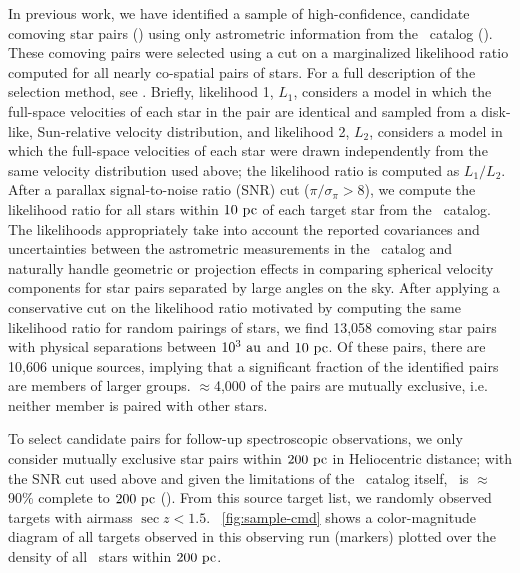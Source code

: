 \documentclass[modern, letterpaper]{aastex61}
\newcommand{\tgas}{\acronym{TGAS}}
\begin{document}
In previous work, we have identified a sample of high-confidence, candidate
comoving star pairs (\citealt{Oh:2017}) using only astrometric information from
the \tgas\ catalog (\citealt{tgas}).
These comoving pairs were selected using a cut on a marginalized likelihood
ratio computed for all nearly co-spatial pairs of stars.
For a full description of the selection method, see \citealt{Oh:2017}.
Briefly, likelihood 1, $L_1$, considers a model in which the full-space
velocities of each star in the pair are identical and sampled from a disk-like,
Sun-relative velocity distribution, and likelihood 2, $L_2$, considers a model
in which the full-space velocities of each star were drawn independently from
the same velocity distribution used above; the likelihood ratio is computed as
$L_1/L_2$.
After a parallax signal-to-noise ratio (SNR) cut ($\pi/\sigma_\pi > 8$), we
compute the likelihood ratio for all stars within $10~\mathrm{pc}$ of each target star
from the \tgas\ catalog.
The likelihoods appropriately take into account the reported covariances and
uncertainties between the astrometric measurements in the \tgas\ catalog and
naturally handle geometric or projection effects in comparing spherical
velocity components for star pairs separated by large angles on the sky.
After applying a conservative cut on the likelihood ratio motivated by
computing the same likelihood ratio for random pairings of stars, we find
13,058 comoving star pairs with physical separations between $10^3~\mathrm{au}$ and
$10~\mathrm{pc}$.
Of these pairs, there are 10,606 unique sources, implying that a significant
fraction of the identified pairs are members of larger groups.
$\approx$4,000 of the pairs are mutually exclusive, i.e. neither member is
paired with other stars.

To select candidate pairs for follow-up spectroscopic observations, we only
consider mutually exclusive star pairs within $200~\mathrm{pc}$ in Heliocentric
distance; with the SNR cut used above and given the limitations of the \tgas\
catalog itself, \tgas\ is $\approx$90\% complete to $200~\mathrm{pc}$
(\citealt{Bovy:2017}).
From this source target list, we randomly observed targets with airmass $\sec z
< 1.5$.
\figurename~\ref{fig:sample-cmd} shows a color-magnitude diagram of all targets
observed in this observing run (markers) plotted over the density of all \tgas\
stars within $200~\mathrm{pc}$.
\end{document}
